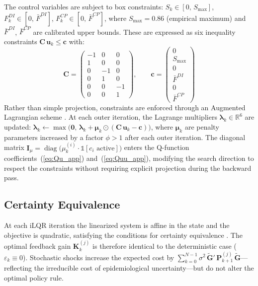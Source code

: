 \documentclass[12pt, a4paper]{article}
\begin{document}
The control variables are subject to box constraints: $S_k \in [0,\, S_{\max}]$,
$F_k^{DI} \in [0,\, \bar{F}^{DI}]$, $F_k^{CP} \in [0,\, \bar{F}^{CP}]$, where
$S_{\max} = 0.86$ (empirical maximum) and $\bar{F}^{DI}$, $\bar{F}^{CP}$ are
calibrated upper bounds. These are expressed as six inequality constraints
$\bm{C}\,\bm{u}_k \leq \bm{c}$ with:
%
\begin{equation}
    \bm{C} = \begin{pmatrix}
    -1 & 0 & 0 \\ 1 & 0 & 0 \\
    0 & -1 & 0 \\ 0 & 1 & 0 \\
    0 & 0 & -1 \\ 0 & 0 & 1
    \end{pmatrix}, \qquad
    \bm{c} = \begin{pmatrix}
    0 \\ S_{\max} \\ 0 \\ \bar{F}^{DI} \\ 0 \\ \bar{F}^{CP}
    \end{pmatrix}
    \label{eq:constraints}
\end{equation}
%
Rather than simple projection, constraints are enforced through an Augmented
Lagrangian scheme \citep{howell2019altro}. At each outer iteration, the
Lagrange multipliers $\bm{\lambda}_k \in \mathbb{R}^6$ are updated:
$\bm{\lambda}_k \leftarrow \max\bigl(\bm{0},\, \bm{\lambda}_k +
\bm{\mu}_k \odot (\bm{C}\,\bm{u}_k - \bm{c})\bigr)$, where
$\bm{\mu}_k$ are penalty parameters increased by a factor $\phi > 1$ after
each outer iteration. The diagonal matrix $\bm{I}_\mu =
\operatorname{diag}\bigl(\mu_k^{(i)} \cdot \mathbb{1}[c_i \text{ active}]\bigr)$
enters the Q-function coefficients~(\ref{eq:Qu_app})
and~(\ref{eq:Quu_app}), modifying the search direction to respect the
constraints without requiring explicit projection during the backward pass.

\subsection{Certainty Equivalence}
\label{app:ce}

At each iLQR iteration the linearized system is affine in the state and the
objective is quadratic, satisfying the conditions for certainty equivalence
\citep[Chapter~3.1]{bertsekas2017dynamic}. The optimal feedback gain
$\bm{K}_k^{(j)}$ is therefore identical to the deterministic case
($\varepsilon_k \equiv 0$). Stochastic shocks increase the expected cost by
$\sum_{k=0}^{N-1} \sigma^2\, \tilde{\bm{G}}'\,\bm{P}_{k+1}^{(j)}\,
\tilde{\bm{G}}$---reflecting the irreducible cost of epidemiological
uncertainty---but do not alter the optimal policy rule.
\end{document}
